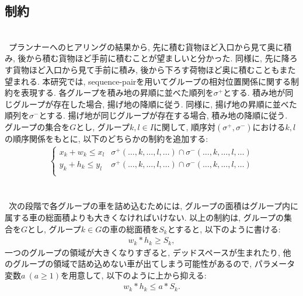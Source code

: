 \subsection{制約}
\\
\ プランナーへのヒアリングの結果から, 先に積む貨物ほど入口から見て奥に積み, 後から積む貨物ほど手前に積むことが望ましいと分かった. 
同様に, 先に降ろす貨物ほど入口から見て手前に積み, 後から下ろす荷物ほど奥に積むこともまた望まれる. 
本研究では, sequence-pairを用いてグループの相対位置関係に関する制約を表現する. 
各グループを積み地の昇順に並べた順列を$\sigma^+$とする. 
積み地が同じグループが存在した場合, 揚げ地の降順に従う. 
同様に, 揚げ地の昇順に並べた順列を$\sigma^-$とする. 
揚げ地が同じグループが存在する場合, 積み地の降順に従う. \\
グループの集合を$G$とし, グループ$k,l \in I$に関して, 順序対$(\sigma^+,\sigma^-)$における$k, l$の順序関係をもとに, 以下のどちらかの制約を追加する: \\
\begin{eqnarray}
    \left\{
        \begin{array}{ll}
            x_k + w_k \leq x_l & \sigma^+(\ldots,k,\ldots,l,\ldots) \cap \sigma^-(\ldots,k,\ldots,l,\ldots) \\
            y_k + h_k \leq y_l & \sigma^+(\ldots,k,\ldots,l,\ldots) \cap \sigma^-(\ldots,k,\ldots,l,\ldots) \\
        \end{array}
    \right.
\end{eqnarray}\\


\\
\ 次の段階で各グループの車を詰め込むためには, グループの面積はグループ内に属する車の総面積よりも大きくなければいけない. 
以上の制約は, グループの集合を$G$とし, グループ$k \in G$の車の総面積を$S_k$とすると, 以下のように書ける: \\
\begin{eqnarray}
    w_k*h_k \geq S_k , 
\end{eqnarray}
一つのグループの領域が大きくなりすぎると, デッドスペースが生まれたり, 他のグループの領域で詰め込めない車が出てしまう可能性があるので, パラメータ変数$a\ (a \geq 1)$を用意して, 以下のように上から抑える:  
\begin{eqnarray}
    w_k*h_k \leq a*S_k.
    \label{a_const}
\end{eqnarray}\\

